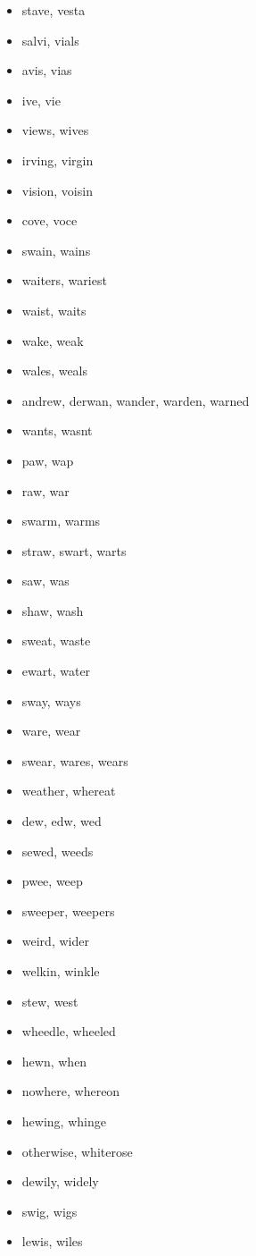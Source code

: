 \documentclass[a4wide,11pt]{report}
\begin{document}
\begin{itemize}
  \item stave, vesta
  \item salvi, vials
  \item avis, vias
  \item ive, vie
  \item views, wives
  \item irving, virgin
  \item vision, voisin
  \item cove, voce
  \item swain, wains
  \item waiters, wariest
  \item waist, waits
  \item wake, weak
  \item wales, weals
  \item andrew, derwan, wander, warden, warned
  \item wants, wasnt
  \item paw, wap
  \item raw, war
  \item swarm, warms
  \item straw, swart, warts
  \item saw, was
  \item shaw, wash
  \item sweat, waste
  \item ewart, water
  \item sway, ways
  \item ware, wear
  \item swear, wares, wears
  \item weather, whereat
  \item dew, edw, wed
  \item sewed, weeds
  \item pwee, weep
  \item sweeper, weepers
  \item weird, wider
  \item welkin, winkle
  \item stew, west
  \item wheedle, wheeled
  \item hewn, when
  \item nowhere, whereon
  \item hewing, whinge
  \item otherwise, whiterose
  \item dewily, widely
  \item swig, wigs
  \item lewis, wiles

\end{itemize}
\end{document}

